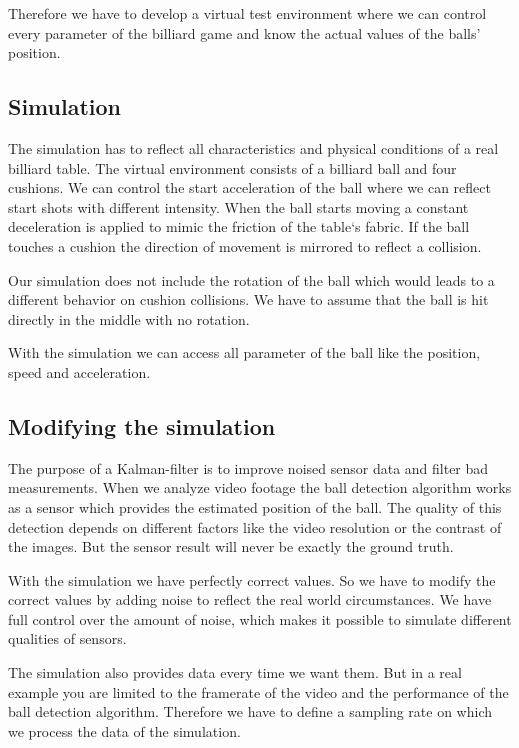 \documentclass[titlepage, a4paper, 11pt]{scrartcl}
\begin{document}
    Therefore we have to develop a virtual test environment where we can control every parameter of the billiard game and know the actual values of the balls' position.

        \subsection{Simulation}

        The simulation has to reflect all characteristics and physical conditions of a real billiard table.
        The virtual environment consists of a billiard ball and four cushions.
        We can control the start acceleration of the ball where we can reflect start shots with different intensity.
        When the ball starts moving a constant deceleration is applied to mimic the friction of the table`s fabric.
        If the ball touches a cushion the direction of movement is mirrored to reflect a collision.

        Our simulation does not include the rotation of the ball which would leads to a different behavior on cushion collisions.
        We have to assume that the ball is hit directly in the middle with no rotation.

        With the simulation we can access all parameter of the ball like the position, speed and acceleration.

        \subsection{Modifying the simulation}

        The purpose of a Kalman-filter is to improve noised sensor data and filter bad measurements.
        When we analyze video footage the ball detection algorithm works as a sensor which provides the estimated position of the ball.
        The quality of this detection depends on different factors like the video resolution or the contrast of the images.
        But the sensor result will never be exactly the ground truth.

        With the simulation we have perfectly correct values. So we have to modify the correct values by adding noise to reflect the real world circumstances.
        We have full control over the amount of noise, which makes it possible to simulate different qualities of sensors.

        The simulation also provides data every time we want them. But in a real example you are limited to the framerate of the video and the performance of the ball detection algorithm.
        Therefore we have to define a sampling rate on which we process the data of the simulation. 
\end{document}
